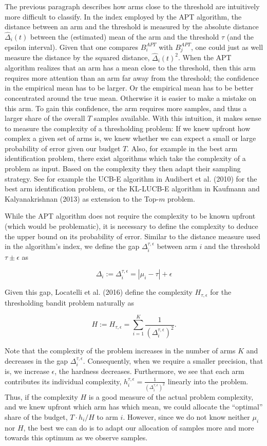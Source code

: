 \documentclass[12pt,]{article}
\begin{document}
The previous paragraph describes how arms close to the threshold are
intuitively more difficult to classify. In the index employed by the APT
algorithm, the distance between an arm and the threshold is measured by
the absolute distance \(\hat{\Delta}_i(t)\) between the (estimated) mean
of the arm and the threshold \(\tau\) (and the epsilon interval). Given
that one compares \(B_i^{APT}\) with \(B_j^{APT}\), one could just as
well measure the distance by the squared distance,
\(\hat{\Delta}_i(t)^2\). When the APT algorithm realizes that an arm has
a mean close to the threshold, then this arm requires more attention
than an arm far away from the threshold; the confidence in the empirical
mean has to be larger. Or the empirical mean has to be better
concentrated around the true mean. Otherwise it is easier to make a
mistake on this arm. To gain this confidence, the arm requires more
samples, and thus a larger share of the overall \(T\) samples available.
With this intuition, it makes sense to measure the complexity of a
thresholding problem: If we knew upfront how complex a given set of arms
is, we knew whether we can expect a small or large probability of error
given our budget \(T\). Also, for example in the best arm identification
problem, there exist algorithms which take the complexity of a problem
as input. Based on the complexity they then adapt their sampling
strategy. See for example the UCB-E algorithm in Audibert et al. (2010)
for the best arm identification problem, or the KL-LUCB-E algorithm in
Kaufmann and Kalyanakrishnan (2013) as extension to the Top-\(m\)
problem.

While the APT algorithm does not require the complexity to be known
upfront (which would be problematic), it is necessary to define the
complexity to deduce the upper bound on its probability of error.
Similar to the distance measure used in the algorithm's index, we define
the gap \(\Delta_i^{\tau,\epsilon}\) between arm \(i\) and the threshold
\(\tau \pm \epsilon\) as

\[
\Delta_i := \Delta_i^{\tau,\epsilon} = |\mu_i - \tau| + \epsilon
\]

Given this gap, Locatelli et al. (2016) define the complexity
\(H_{\tau, \epsilon}\) for the thresholding bandit problem naturally as

\[
H := H_{\tau, \epsilon} = \sum_{i=1}^K \frac{1}{(\Delta_i^{\tau,\epsilon})^2}.
\]

Note that the complexity of the problem increases in the number of arms
\(K\) and decreases in the gap \(\Delta_i^{\tau,\epsilon}\).
Consequently, when we require a smaller precision, that is, we increase
\(\epsilon\), the hardness decreases. Furthermore, we see that each arm
contributes its individual complexity,
\(h_i^{\tau,\epsilon} = \frac{1}{(\Delta_i^{\tau,\epsilon})^2}\)
linearly into the problem. Thus, if the complexity \(H\) is a good
measure of the actual problem complexity, and we knew upfront which arm
has which mean, we could allocate the ``optimal'' share of the budget,
\(T \cdot h_i /H\) to arm \(i\). However, since we do not know neither
\(\mu_i\) nor \(H\), the best we can do is to adapt our allocation of
samples more and more towards this optimum as we observe samples.
\end{document}
